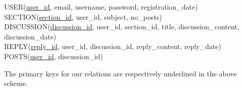 \documentclass[12pt,a4paper]{amsart}
\begin{document}
{\begin{tcolorbox}[colback=orange!5!white,colframe=orange!75!black]
  USER(\underline{user\_id}, email, username, password, registration\_date)\\
  SECTION(\underline{section\_id}, user\_id, subject, no\_posts)\\
  DISCUSSION(\underline{discussion\_id}, user\_id, section\_id, title, discussion\_content, discussion\_date)\\
  REPLY(\underline{reply\_id}, user\_id, discussion\_id, reply\_content, reply\_date)\\
  POSTS(\underline{user\_id}, discussion\_id)
\end{tcolorbox}
\vspace{2mm}
The primary keys for our relations are respectively underlined in the above scheme. 

}
\end{document}
